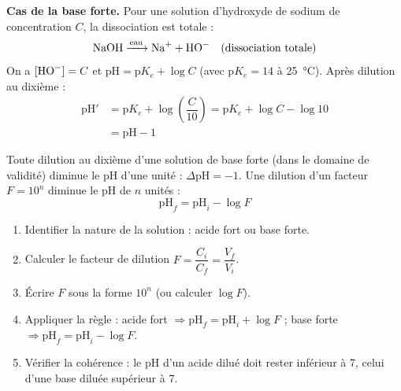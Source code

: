 \documentclass[11pt]{article}
\newcommand{\cle}[1]{{\popxbold\color{popdark}#1}}
\begin{document}
\textbf{Cas de la base forte.} Pour une solution d'hydroxyde de sodium de concentration $C$, la dissociation est totale :
\[ \ce{NaOH ->[eau] Na+ + HO-} \quad\text{(dissociation totale)} \]
On a $[\ce{HO-}] = C$ et $\mathrm{pH} = \mathrm{p}K_e + \log C$ (avec $\mathrm{p}K_e = 14$ à \SI{25}{\celsius}). Après dilution au dixième :
\begin{align*}
\mathrm{pH}' &= \mathrm{p}K_e + \log\left(\dfrac{C}{10}\right) = \mathrm{p}K_e + \log C - \log 10 \\
&= \mathrm{pH} - 1
\end{align*}

\begin{propriete}
Toute dilution au dixième d'une solution de base forte (dans le domaine de validité) \cle{diminue le pH d'une unité} : $\Delta\mathrm{pH} = -1$. Une dilution d'un facteur $F = 10^{n}$ diminue le pH de $n$ unités :
\[ \mathrm{pH}_f = \mathrm{pH}_i - \log F \]
\end{propriete}

\begin{methode}
\begin{enumerate}
\item Identifier la nature de la solution : acide fort ou base forte.
\item Calculer le facteur de dilution $F = \dfrac{C_i}{C_f} = \dfrac{V_f}{V_i}$.
\item Écrire $F$ sous la forme $10^{n}$ (ou calculer $\log F$).
\item Appliquer la règle : acide fort $\Rightarrow \mathrm{pH}_f = \mathrm{pH}_i + \log F$ ; base forte $\Rightarrow \mathrm{pH}_f = \mathrm{pH}_i - \log F$.
\item Vérifier la cohérence : le pH d'un acide dilué doit rester inférieur à 7, celui d'une base diluée supérieur à 7.
\end{enumerate}
\end{methode}
\end{document}

